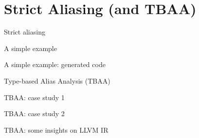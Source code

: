 \section{Strict Aliasing (and TBAA)}

\begin{frame}{Strict aliasing}
\end{frame}

\begin{frame}{A simple example}
\end{frame}

\begin{frame}{A simple example: generated code}
\end{frame}

\begin{frame}{Type-based Alias Analysis (TBAA)}
\end{frame}

\begin{frame}{TBAA: case study 1}
\end{frame}

\begin{frame}{TBAA: case study 2}
\end{frame}

\begin{frame}{TBAA: some insights on LLVM IR}
\end{frame}
